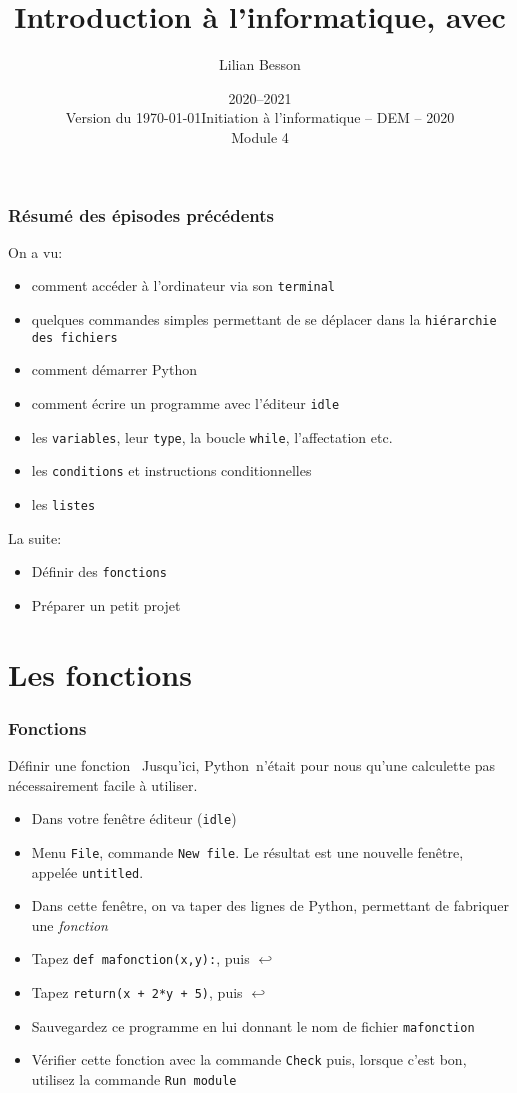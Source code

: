 \documentclass{beamer}
\title{Introduction à l'informatique, avec \pyth{}}
\author{Lilian Besson}
\date{2020--2021\\Version du \today}
\institute%
{ENS Rennes}
\date%
[Info -- DEM -- 2020]{Initiation à l'informatique -- DEM -- 2020\\Module 4}
\newcommand{\mypause}{~}
\newcommand{\alalign}{{$\hookleftarrow$}}
\newcommand{\pyth}{{\sc Python}}
\newcommand{\prog}[1]{\alert{\texttt{#1}}}
\begin{document}
\frame{\titlepage}

\section[Outline]{}
\frame{\tableofcontents}
\frame
{
\frametitle{Résumé des épisodes précédents}
{
On a vu:
  \begin{itemize}
  \item comment accéder à l'ordinateur via son \prog{terminal}
  \item quelques commandes simples permettant de se déplacer dans la \prog{hiérarchie des fichiers}
  \item comment démarrer \pyth{}
  \item comment écrire un programme avec l'éditeur \prog{idle}
  \item les \prog{variables}, leur \prog{type}, la boucle \prog{while}, l'affectation etc.
  \item les \prog{conditions} et instructions conditionnelles
  \item les \prog{listes}
  \end{itemize}
La suite:
  \begin{itemize}
  \item Définir des \prog{fonctions}
  \item Préparer un petit projet
  \end{itemize}
}
}

\section{Les fonctions}
\frame
{
\frametitle{Fonctions}
{\footnotesize
\begin{block}{Définir une fonction}\mypause{}
Jusqu'ici, \pyth{} n'était pour nous qu'une calculette
pas nécessairement facile à utiliser. \mypause{}
\begin{itemize}
\item Dans votre fenêtre éditeur (\prog{idle})\mypause{}
\item Menu \prog{File}, commande \prog{New file}.
Le résultat est une nouvelle fenêtre, appelée \prog{untitled}.\mypause{}
\item Dans cette fenêtre, on va taper des lignes de \pyth{}, permettant de fabriquer une
\alert{\em fonction}\mypause{}
\item Tapez \prog{def mafonction(x,y):}, puis \alalign{}\mypause{}
\item Tapez \prog{return(x + 2*y + 5)}, puis \alalign{}\mypause{}
\item \alert{Sauvegardez} ce programme en lui donnant le nom de fichier \prog{mafonction}\mypause{}
\item Vérifier cette fonction avec la commande \texttt{Check} puis, lorsque c'est bon,
utilisez la commande \texttt{Run module}
\end{itemize}
\end{block}
}
}
\end{document}
